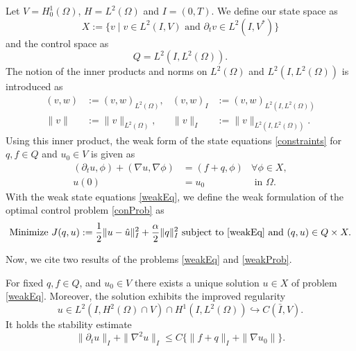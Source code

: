 Let $V=H_0^1(\Omega)$, $H=L^2(\Omega)$ and $I=(0,T)$. We define our state space as
\begin{displaymath}
X:=\{v\mid v\in L^2(I,V)\text{ and }\partial_tv\in L^2(I,V^*)\}
\end{displaymath}
and the control space as
\begin{displaymath}
Q=L^2(I,L^2(\Omega)).
\end{displaymath}
The notion of the inner products and norms on $L^2(\Omega)$ and $L^2(I,L^2(\Omega))$ is introduced as
\begin{align*}
(v,w)&:=(v,w)_{L^2(\Omega)},&(v,w)_I&:=(v,w)_{L^2(I,L^2(\Omega))}\\
\|v\|&:=\|v\|_{L^2(\Omega)},&\|v\|_I&:=\|v\|_{L^2(I,L^2(\Omega))}.
\end{align*}
Using this inner product, the weak form of the state equations \eqref{constraints} for $q,f\in Q$ and $u_0\in V$ is given as
\begin{equation}
\label{weakEq}
\begin{aligned}
	(\partial_tu,\phi)+(\nabla u,\nabla\phi)&=(f+q,\phi)&\forall\phi\in X,\\
	u(0)&=u_0&\text{ in }\Omega.
\end{aligned}
\end{equation}
With the weak state equations \eqref{weakEq}, we define the weak formulation of the optimal control problem \eqref{conProb} as
\begin{equation}
\label{weakProb}
\text{Minimize }J(q,u):=\frac{1}{2}\|u-\hat{u}\|_I^2+\frac{\alpha}{2}\|q\|_I^2\text{ subject to \eqref{weakEq} and }(q,u)\in Q\times X.
\end{equation}

Now, we cite two results of the problems \eqref{weakEq} and \eqref{weakProb}.

\begin{prop}
\label{uniqueU}
For fixed $q,f\in Q$, and $u_0\in V$ there exists a unique solution $u\in X$ of problem \eqref{weakEq}. Moreover, the solution exhibits the improved regularity
\begin{displaymath}
u\in L^2(I,H^2(\Omega)\cap V)\cap H^1(I,L^2(\Omega))\hookrightarrow C(\bar{I},V).
\end{displaymath}
It holds the stability estimate
\begin{displaymath}
\|\partial_tu\|_I+\|\nabla^2u\|_I\leq C\{\|f+q\|_I+\|\nabla u_0\|\}.
\end{displaymath}
\end{prop}

